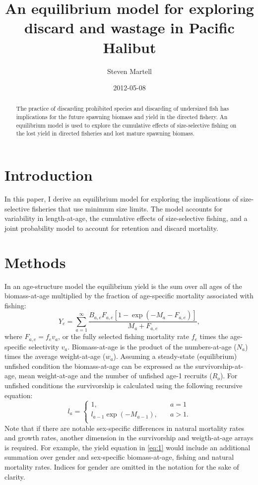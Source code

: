 \documentclass[12pt]{article}
\title{An equilibrium model for exploring discard and wastage in Pacific Halibut}
\author{ Steven Martell }
\date{2012-05-08}
\begin{document}
\ifpdf
{}
\else
{}
\fi

\maketitle


\begin{abstract}
	The practice of discarding prohibited species and discarding of undersized fish has implications for the future spawning biomass and yield in the directed fishery.  An equilibrium model is used to explore the cumulative effects of size-selective fishing on the lost yield in directed fisheries and lost mature spawning biomass.
\end{abstract}

\section{Introduction} %
\label{sec:introduction}
In this paper, I derive an equilibrium model for exploring the implications of size-selective fisheries that use minimum size limits.  The model accounts for variability in length-at-age,  the cumulative effects of size-selective fishing, and a joint probability model to account for retention and discard mortality.

\section{Methods} %
\label{sec:methods}
In an age-structure model the equilibrium yield is the sum over all ages of the biomass-at-age multiplied by the fraction of age-specific mortality associated with fishing:
\begin{equation}\label{eq:1}
	Y_e = \sum_{a=1}^\infty  \frac{ B_{a,e} F_{a,e}[1-\exp(-M_a-F_{a,e})] }{ M_a + F_{a,e} },
\end{equation}
where $F_{a,e} = f_e v_a$, or the fully selected fishing mortality rate $f_e$ times the age-specific selectivity $v_a$.  Biomass-at-age is the product of the numbers-at-age ($N_a$) times the average weight-at-age ($w_a$). Assuming a steady-state (equilibrium) unfished condition the biomass-at-age can be expressed as the survivorship-at-age, mean weight-at-age and the number of unfished age-1 recruits ($R_o$).  For unfished conditions the survivorship is calculated using the following recursive equation:
\begin{equation}\label{eq:2}
l_a = \begin{cases}
    1, &\quad a=1\\
    l_{a-1}\exp(-M_{a-1}), &\quad a>1.\\
\end{cases}
\end{equation}
Note that if there are notable sex-specific differences in natural mortality rates and growth rates, another dimension in the survivorship and weigth-at-age arrays is required. For example, the yield equation in \eqref{eq:1} would include an additional summation over gender and sex-specific biomass-at-age, fishing and natural mortality rates. Indices for gender are omitted in the notation for the sake of clarity.
\end{document}
